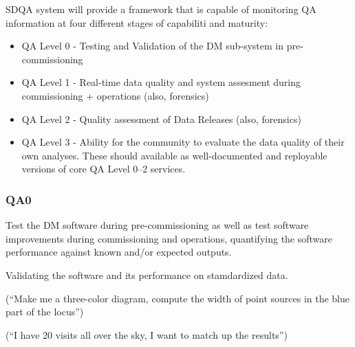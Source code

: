 SDQA system will provide a framework that is capable of monitoring QA
information at four different stages of capabiliti and maturity:

\begin{itemize}
\item QA Level 0 - Testing and Validation of the DM sub-system in pre-commissioning
\item QA Level 1 - Real-time data quality and system assesment during commissioning + operations (also, forensics)
\item QA Level 2 - Quality assessment of Data Releases (also, forensics)
\item QA Level 3 - Ability for the community to evaluate the data quality of their own analyses. These should available as well-documented and reployable versions of core QA Level 0--2 services.
\end{itemize}

\subsubsection{QA0}

Test the DM software during pre-commissioning as well as test software improvements during commissioning and operations, quantifying the software performance against known and/or expected outputs.

Validating the software and its performance on stamdardized data.

(“Make me a three-color diagram, compute the width of point sources in the blue part of the locus”)

(“I have 20 visits all over the sky, I want to match up the results”)

